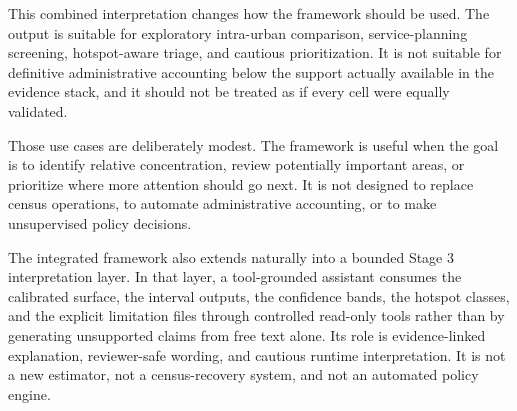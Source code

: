 This combined interpretation changes how the framework should be used. The output is suitable for exploratory intra-urban comparison, service-planning screening, hotspot-aware triage, and cautious prioritization. It is not suitable for definitive administrative accounting below the support actually available in the evidence stack, and it should not be treated as if every cell were equally validated.

Those use cases are deliberately modest. The framework is useful when the goal is to identify relative concentration, review potentially important areas, or prioritize where more attention should go next. It is not designed to replace census operations, to automate administrative accounting, or to make unsupervised policy decisions.

The integrated framework also extends naturally into a bounded Stage 3 interpretation layer. In that layer, a tool-grounded assistant consumes the calibrated surface, the interval outputs, the confidence bands, the hotspot classes, and the explicit limitation files through controlled read-only tools rather than by generating unsupported claims from free text alone. Its role is evidence-linked explanation, reviewer-safe wording, and cautious runtime interpretation. It is not a new estimator, not a census-recovery system, and not an automated policy engine.
